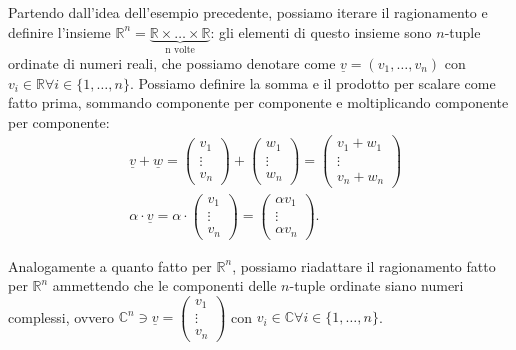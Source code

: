 \begin{example}
    Partendo dall'idea dell'esempio precedente, possiamo iterare il ragionamento e definire l'insieme $\mathbb{R}^n = \underbrace{\mathbb{R} \times \ldots \times \mathbb{R}}_{\text{n volte}}$: gli elementi di questo insieme sono $n$-tuple ordinate di numeri reali, che possiamo denotare come $\underline{v} = (v_1, \ldots, v_n)$ con $v_i \in \mathbb{R} \forall i \in \{ 1, \ldots, n \}$. Possiamo definire la somma e il prodotto per scalare come fatto prima, sommando componente per componente e moltiplicando componente per componente:
    \begin{align}
        &\underline{v} + \underline{w} = \begin{pmatrix} v_1 \\ \vdots \\ v_n \end{pmatrix} + \begin{pmatrix} w_1 \\ \vdots \\ w_n \end{pmatrix} = \begin{pmatrix} v_1 + w_1 \\ \vdots \\ v_n + w_n \end{pmatrix} \\
        &\alpha \cdot \underline{v} = \alpha \cdot \begin{pmatrix} v_1 \\ \vdots \\ v_n \end{pmatrix} = \begin{pmatrix} \alpha v_1 \\ \vdots \\ \alpha v_n \end{pmatrix}.
    \end{align}
\end{example}
\begin{example}
    Analogamente a quanto fatto per $\mathbb{R}^n$, possiamo riadattare il ragionamento fatto per $\mathbb{R}^n$ ammettendo che le componenti delle $n$-tuple ordinate siano numeri complessi, ovvero $\mathbb{C}^n \ni \underline{v} = \begin{pmatrix} v_1 \\ \vdots \\ v_n \end{pmatrix}$ con $v_i \in \mathbb{C} \forall i \in \{ 1, \ldots, n \}$.
\end{example}
